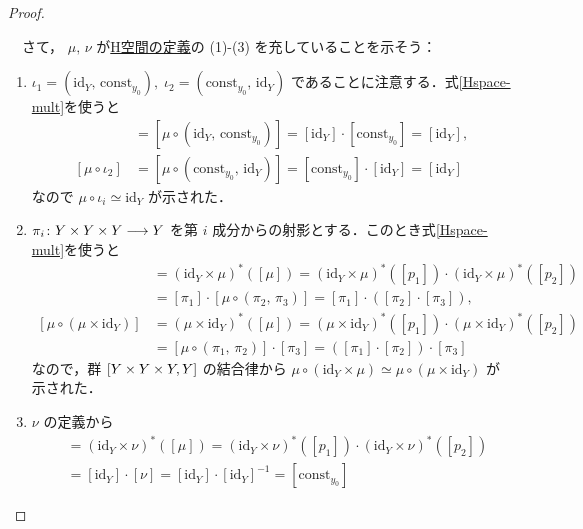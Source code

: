\documentclass[algtopo_main]{subfiles}
\begin{document}
\begin{proof}
\begin{itemize}
\begin{description}
            　さて， $\mu,\, \nu$ が\hyperref[def:Hspace]{H空間の定義}の (1)-(3) を充していることを示そう：
            \begin{enumerate}
                \item 
                $\iota_1 = (\mathrm{id}_Y,\, \mathrm{const}_{y_0}),\; \iota_2 = (\mathrm{const}_{y_0},\, \mathrm{id}_Y)$ であることに注意する．式\eqref{Hspace-mult}を使うと
                \begin{align}
                    [\mu \circ \iota_1] &= [\mu \circ (\mathrm{id}_Y,\, \mathrm{const}_{y_0})] = [\mathrm{id}_Y] \cdot [\mathrm{const}_{y_0}] = [\mathrm{id}_Y], \\
                    [\mu \circ \iota_2] &= [\mu \circ (\mathrm{const}_{y_0},\, \mathrm{id}_Y)] = [\mathrm{const}_{y_0}] \cdot [\mathrm{id}_Y] = [\mathrm{id}_Y]
                \end{align}
                なので $\mu \circ \iota_i \simeq \mathrm{id}_Y$ が示された．
                \item 
                $\pi_i \colon Y \times Y \times Y \longrightarrow Y$ を第 $i$ 成分からの射影とする．このとき式\eqref{Hspace-mult}を使うと
                \begin{align}
                    [\mu \circ (\mathrm{id}_Y \times \mu)] &= (\mathrm{id}_Y \times \mu)^*([\mu]) = (\mathrm{id}_Y \times \mu)^*([p_1]) \cdot (\mathrm{id}_Y \times \mu)^*([p_2]) \\
                    &= [\pi_1] \cdot [\mu \circ (\pi_2,\, \pi_3)] = [\pi_1] \cdot ([\pi_2] \cdot [\pi_3]), \\
                    [\mu \circ (\mu \times \mathrm{id}_Y)] &= (\mu \times \mathrm{id}_Y)^*([\mu]) = (\mu \times \mathrm{id}_Y)^*([p_1]) \cdot (\mu \times \mathrm{id}_Y)^*([p_2]) \\
                    &= [\mu \circ (\pi_1,\, \pi_2)] \cdot [\pi_3] = ([\pi_1] \cdot [\pi_2]) \cdot [\pi_3]
                \end{align}
                なので，群 $\comm{Y\times Y \times Y}{Y}$ の結合律から $\mu \circ (\mathrm{id}_Y \times \mu) \simeq \mu \circ (\mu \times \mathrm{id}_Y)$ が示された．
                \item $\nu$ の定義から
                \begin{align}
                    [\mu \circ (\mathrm{id}_Y \times \nu)] &= (\mathrm{id}_Y \times \nu)^*([\mu]) = (\mathrm{id}_Y \times \nu)^*([p_1]) \cdot (\mathrm{id}_Y \times \nu)^*([p_2]) \\
                    &= [\mathrm{id}_Y] \cdot [\nu] = [\mathrm{id}_Y] \cdot [\mathrm{id}_Y]^{-1} = [\mathrm{const}_{y_0}]

\end{align}
\end{enumerate}
\end{description}
\end{itemize}
\end{proof}
\end{document}
